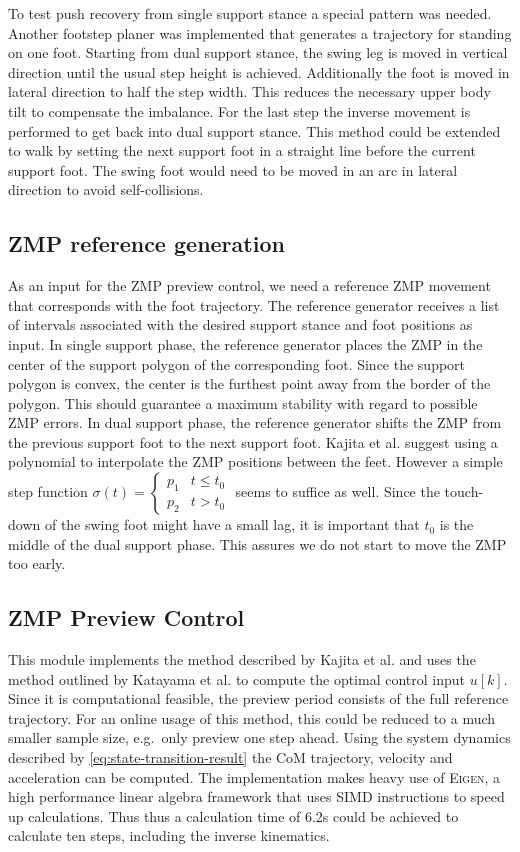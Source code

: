 \documentclass[english,ngerman]{KITreprt}
\newcommand{\name}[1]{\textsc{#1}}
\begin{document}
To test push recovery from single support stance a special pattern was
needed. Another footstep planer was implemented that generates a
trajectory for standing on one foot. Starting from dual support stance,
the swing leg is moved in vertical direction until the usual step height
is achieved. Additionally the foot is moved in lateral direction to half
the step width. This reduces the necessary upper body tilt to compensate
the imbalance. For the last step the inverse movement is performed to
get back into dual support stance. This method could be extended to walk
by setting the next support foot in a straight line before the current
support foot. The swing foot would need to be moved in an arc in lateral
direction to avoid self-collisions.

\subsection{ZMP reference generation}\label{zmp-reference-generation}

As an input for the ZMP preview control, we need a reference ZMP
movement that corresponds with the foot trajectory. The reference
generator receives a list of intervals associated with the desired
support stance and foot positions as input. In single support phase, the
reference generator places the ZMP in the center of the support polygon
of the corresponding foot. Since the support polygon is convex, the
center is the furthest point away from the border of the polygon. This
should guarantee a maximum stability with regard to possible ZMP errors.
In dual support phase, the reference generator shifts the ZMP from the
previous support foot to the next support foot. Kajita et al. suggest
using a polynomial to interpolate the ZMP positions between the feet.
However a simple step function
$\sigma(t) = \left\{\begin{array}{lr}p_1 & t \leq t_0 \\ p_2 & t > t_0 \end{array}\right.$
seems to suffice as well. Since the touch-down of the swing foot might
have a small lag, it is important that $t_0$ is the middle of the dual
support phase. This assures we do not start to move the ZMP too early.

\subsection{ZMP Preview Control}\label{zmp-preview-control}

This module implements the method described by Kajita et al. and uses
the method outlined by Katayama et al. to compute the optimal control
input $u[k]$. Since it is computational feasible, the preview period
consists of the full reference trajectory. For an online usage of this
method, this could be reduced to a much smaller sample size, e.g.~only
preview one step ahead. Using the system dynamics described by
\ref{eq:state-transition-result} the CoM trajectory, velocity and
acceleration can be computed. The implementation makes heavy use of
\name{Eigen}, a high performance linear algebra framework that uses SIMD
instructions to speed up calculations. Thus thus a calculation time of
6.2s could be achieved to calculate ten steps, including the inverse
kinematics.
\end{document}
